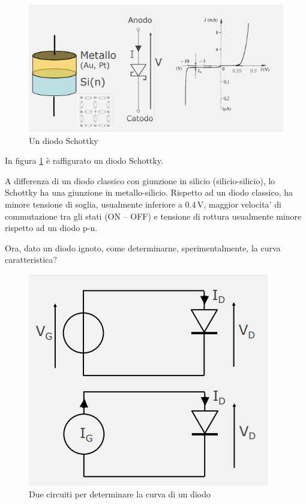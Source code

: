 \documentclass{article}
\begin{document}
\begin{figure}[h]
  \centering
  \includegraphics[scale=0.7]{IM_diodo_Schottky}
  \caption{Un diodo Schottky}
  \label{Schema_diodo_Schottky}
\end{figure}

In figura \ref{Schema_diodo_Schottky} è raffigurato un diodo Schottky.

\vspace{1mm}

A differenza di un diodo classico con giunzione in silicio (silicio-silicio), lo Schottky ha una giunzione in metallo-silicio. Rispetto ad un diodo classico, ha minore tensione di soglia, usualmente inferiore a $0.4\, \textrm{V}$, maggior velocita’ di commutazione tra gli stati (ON – OFF) e tensione di rottura usualmente minore rispetto ad un diodo p-n.

\clearpage

Ora, dato un diodo ignoto, come determinarne, sperimentalmente, la curva caratteristica?

\begin{figure}[h]
  \centering
  \includegraphics[scale=0.7]{IM_diodo_misura}
  \caption{Due circuiti per determinare la curva di un diodo}
  \label{Schema_diodo_misura}
\end{figure}
\end{document}
